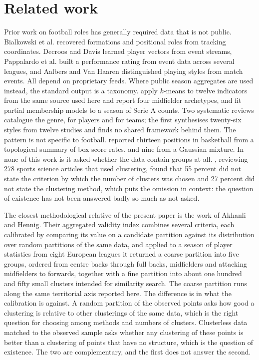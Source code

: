 \section{Related work}
\label{sec:related}

Prior work on football roles has generally required data that is not public. Bialkowski et
al. \citep{bialkowski2014large} recovered formations and positional roles from tracking
coordinates. Decroos and Davis \citep{decroos2019player} learned player vectors from event
streams, Pappalardo et al. \citep{pappalardo2019playerank} built a performance rating from
event data across several leagues, and Aalbers and Van Haaren
\citep{aalbers2019distinguishing} distinguished playing styles from match events. All
depend on proprietary feeds. Where public season aggregates are used instead, the standard
output is a taxonomy. \citet{elfoukahi2026unveiling} apply $k$-means to twelve indicators
from the same source used here and report four midfielder archetypes, and
\citet{seri2024partial} fit partial membership models to a season of Serie A counts. Two
systematic reviews catalogue the genre, \citet{plakias2023identifying} for players and
\citet{gu2025playing} for teams; the first synthesises twenty-six styles from twelve
studies and finds no shared framework behind them. The pattern is not specific to
football. \citet{alagappan2012from} reported thirteen positions in basketball from a
topological summary of box score rates, and \citet{kalman2020nba} nine from a Gaussian
mixture. In none of this work is it asked whether the data contain groups at all.
\citet{fernandez2024reporting}, reviewing 278 sports science articles that used
clustering, found that 55 percent did not state the criterion by which the number of
clusters was chosen and 27 percent did not state the clustering method, which puts the
omission in context: the question of existence has not been answered badly so much as not
asked.

The closest methodological relative of the present paper is the work of Akhanli and
Hennig. Their aggregated validity index \citep{akhanli2020comparing} combines several
criteria, each calibrated by comparing its value on a candidate partition against its
distribution over random partitions of the same data, and applied to a season of player
statistics from eight European leagues \citep{akhanli2023clustering} it returned a coarse
partition into five groups, ordered from centre backs through full backs, midfielders and
attacking midfielders to forwards, together with a fine partition into about one hundred
and fifty small clusters intended for similarity search. The coarse partition runs along
the same territorial axis reported here. The difference is in what the calibration is
against. A random partition of the observed points asks how good a clustering is relative
to other clusterings of the same data, which is the right question for choosing among
methods and numbers of clusters. Clusterless data matched to the observed sample asks
whether any clustering of these points is better than a clustering of points that have no
structure, which is the question of existence. The two are complementary, and the first
does not answer the second.

